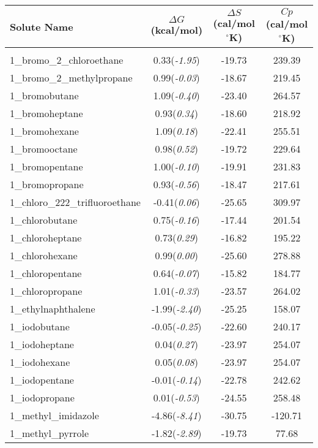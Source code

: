\documentclass{amsart}
\begin{document}
 
\begin{center}
\begin{longtable}{l|c|c|c} 
\textbf{Solute Name}&\textbf{$\Delta G$(kcal/mol)}&\textbf{$\Delta S$(cal/mol$^\circ$K)}&\textbf{$Cp$(cal/mol$^\circ$K)} \\ 
\hline \\ 
1\_bromo\_2\_chloroethane & 0.33(\textit{-1.95}) & -19.73 & 239.39 \\ 
1\_bromo\_2\_methylpropane & 0.99(\textit{-0.03}) & -18.67 & 219.45 \\ 
1\_bromobutane & 1.09(\textit{-0.40}) & -23.40 & 264.57 \\ 
1\_bromoheptane & 0.93(\textit{0.34}) & -18.60 & 218.92 \\ 
1\_bromohexane & 1.09(\textit{0.18}) & -22.41 & 255.51 \\ 
1\_bromooctane & 0.98(\textit{0.52}) & -19.72 & 229.64 \\ 
1\_bromopentane & 1.00(\textit{-0.10}) & -19.91 & 231.83 \\ 
1\_bromopropane & 0.93(\textit{-0.56}) & -18.47 & 217.61 \\ 
1\_chloro\_222\_trifluoroethane & -0.41(\textit{0.06}) & -25.65 & 309.97 \\ 
1\_chlorobutane & 0.75(\textit{-0.16}) & -17.44 & 201.54 \\ 
1\_chloroheptane & 0.73(\textit{0.29}) & -16.82 & 195.22 \\ 
1\_chlorohexane & 0.99(\textit{0.00}) & -25.60 & 278.88 \\ 
1\_chloropentane & 0.64(\textit{-0.07}) & -15.82 & 184.77 \\ 
1\_chloropropane & 1.01(\textit{-0.33}) & -23.57 & 264.02 \\ 
1\_ethylnaphthalene & -1.99(\textit{-2.40}) & -25.25 & 158.07 \\ 
1\_iodobutane & -0.05(\textit{-0.25}) & -22.60 & 240.17 \\ 
1\_iodoheptane & 0.04(\textit{0.27}) & -23.97 & 254.07 \\ 
1\_iodohexane & 0.05(\textit{0.08}) & -23.97 & 254.07 \\ 
1\_iodopentane & -0.01(\textit{-0.14}) & -22.78 & 242.62 \\ 
1\_iodopropane & 0.01(\textit{-0.53}) & -24.55 & 258.48 \\ 
1\_methyl\_imidazole & -4.86(\textit{-8.41}) & -30.75 & -120.71 \\ 
1\_methyl\_pyrrole & -1.82(\textit{-2.89}) & -19.73 & 77.68 \\ 

\end{longtable}
\end{center}
\end{document}
